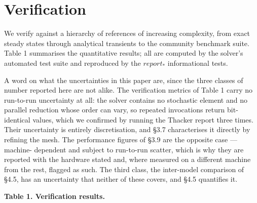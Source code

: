\section{Verification}

We verify against a hierarchy of references of increasing complexity,
from exact steady states through analytical transients to the community
benchmark suite. Table 1 summarises the quantitative results; all are
computed by the solver's automated test suite and reproduced by the
\(report_*\) informational tests.

A word on what the uncertainties in this paper are, since the three
classes of number reported here are not alike. The verification metrics
of Table 1 carry no run-to-run uncertainty at all: the solver contains
no stochastic element and no parallel reduction whose order can vary, so
repeated invocations return bit-identical values, which we confirmed by
running the Thacker report three times. Their uncertainty is entirely
discretisation, and §3.7 characterises it directly by refining the mesh.
The performance figures of §3.9 are the opposite case --- machine-
dependent and subject to run-to-run scatter, which is why they are
reported with the hardware stated and, where measured on a different
machine from the rest, flagged as such. The third class, the inter-model
comparison of §4.5, has an uncertainty that neither of these covers, and
§4.5 quantifies it.

\textbf{Table 1. Verification results.}

